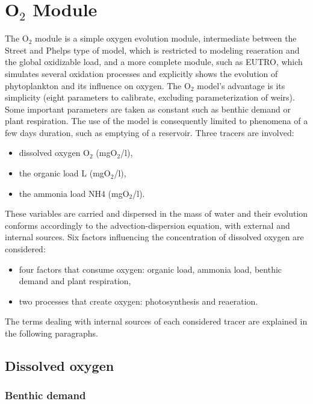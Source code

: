 \chapter{O$_2$ Module}

The O$_2$ module is a simple oxygen evolution module,
intermediate between the Street and Phelps
\cite{kashefipour_dispersion_2002} type of model,
which is restricted to modeling reaeration and the global oxidizable load,
and a more complete module, such as EUTRO, which simulates several oxidation processes
and explicitly shows the evolution of phytoplankton and its influence on oxygen.
The O$_2$ model’s advantage is its simplicity
(eight parameters to calibrate, excluding parameterization of weirs).
Some important parameters are taken as constant such as benthic demand or plant respiration.
The use of the model is consequently limited to phenomena of a few days duration,
such as emptying of a reservoir. Three tracers are involved:

\begin{itemize}
\item dissolved oxygen O$_2$ (mgO$_2$/l),
\item the organic load L (mgO$_2$/l),
\item the ammonia load NH4 (mgO$_2$/l).
\end{itemize}

These variables are carried and dispersed in the mass of water and their evolution
conforms accordingly to the advection-dispersion equation,
with external and internal sources.
Six factors influencing the concentration of dissolved oxygen are considered:

\begin{itemize}
\item four factors that consume oxygen: organic load, ammonia load,
  benthic demand and plant respiration,
\item two processes that create oxygen: photosynthesis and reaeration.
\end{itemize}

The terms dealing with internal sources of each considered tracer are explained
in the following paragraphs.

\section{Dissolved oxygen}

\subsection{Benthic demand}

